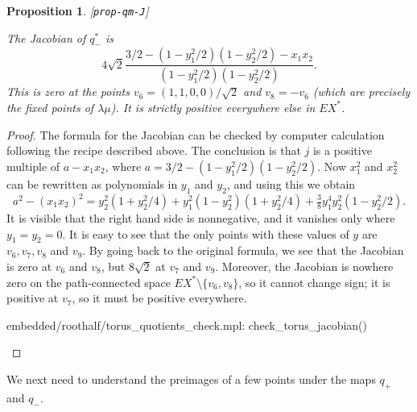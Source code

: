 \documentclass[reqno]{amsart}
\newcommand{\lbl}[1]{\label{#1}\textup{[\texttt{#1}]}\par}
\newcommand{\lbl}{\label}
\newcommand{\lm}        {\lambda}
\newcommand{\sm}        {\setminus}
\newcommand{\rt}        {\sqrt{2}}
\renewcommand{\:}{\colon}
\newtheorem{proposition}[theorem]{Proposition}
\theoremstyle{definition}
\begin{document}
\begin{proposition}\lbl{prop-qm-J}
 The Jacobian of $q^*_-$ is
 \[ 4\rt\frac{3/2-(1-y_1^2/2)(1-y_2^2/2)-x_1x_2}{(1-y_1^2/2)(1-y_2^2/2)}.
 \]
 This is zero at the points $v_6=(1,1,0,0)/\rt$ and $v_8=-v_6$ (which
 are precisely the fixed points of $\lm\mu$).  It is strictly positive
 everywhere else in $EX^*$.
\end{proposition}
\begin{proof}
 The formula for the Jacobian can be checked  by computer calculation
 following the recipe described above.  The conclusion is that $j$ is
 a positive multiple of $a-x_1x_2$, where
 $a=3/2-(1-y_1^2/2)(1-y_2^2/2)$.  Now $x_1^2$ and $x_2^2$ can be
 rewritten as polynomials in $y_1$ and $y_2$, and using this we obtain
 \[ a^2-(x_1x_2)^2 = y_2^2(1+y_2^2/4) +
                     y_1^2(1-y_2^2)(1+y_2^2/4) +
                     \tfrac{3}{8}y_1^4y_2^2(1-y_2^2/2).
 \]
 It is visible that the right hand side is nonnegative, and it
 vanishes only where $y_1=y_2=0$.  It is easy to see that the only
 points with these values of $y$ are $v_6,v_7,v_8$ and $v_9$.  By
 going back to the original formula, we see that the Jacobian is zero
 at $v_6$ and $v_8$, but $8\rt$ at $v_7$ and $v_9$.  Moreover, the
 Jacobian is nowhere zero on the path-connected space
 $EX^*\sm\{v_6,v_8\}$, so it cannot change sign; it is positive at
 $v_7$, so it must be positive everywhere.
 \begin{checks}
  embedded/roothalf/torus_quotients_check.mpl: check_torus_jacobian()
 \end{checks}
\end{proof}

We next need to understand the preimages of a few points under the
maps $q_+$ and $q_-$.
\end{document}
